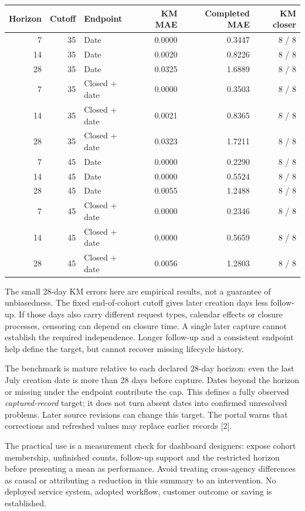\documentclass[10pt,letterpaper]{article}
\begin{document}
\begin{center}\small\begin{tabular}{rrlrrr}\toprule
Horizon & Cutoff & Endpoint & KM MAE & Completed MAE & KM closer\\\midrule
7 & 35 & Date & 0.0000 & 0.3447 & 8 / 8\\
14 & 35 & Date & 0.0020 & 0.8226 & 8 / 8\\
28 & 35 & Date & 0.0325 & 1.6889 & 8 / 8\\
7 & 35 & Closed + date & 0.0000 & 0.3503 & 8 / 8\\
14 & 35 & Closed + date & 0.0021 & 0.8365 & 8 / 8\\
28 & 35 & Closed + date & 0.0323 & 1.7211 & 8 / 8\\
7 & 45 & Date & 0.0000 & 0.2290 & 8 / 8\\
14 & 45 & Date & 0.0000 & 0.5524 & 8 / 8\\
28 & 45 & Date & 0.0055 & 1.2488 & 8 / 8\\
7 & 45 & Closed + date & 0.0000 & 0.2346 & 8 / 8\\
14 & 45 & Closed + date & 0.0000 & 0.5659 & 8 / 8\\
28 & 45 & Closed + date & 0.0056 & 1.2803 & 8 / 8\\
\bottomrule\end{tabular}\end{center}

The small 28-day KM errors here are empirical results, not a guarantee of unbiasedness. The fixed end-of-cohort cutoff gives later creation days less follow-up. If those days also carry different request types, calendar effects or closure processes, censoring can depend on closure time. A single later capture cannot establish the required independence. Longer follow-up and a consistent endpoint help define the target, but cannot recover missing lifecycle history.

The benchmark is mature relative to each declared 28-day horizon: even the last July creation date is more than 28 days before capture. Dates beyond the horizon or missing under the endpoint contribute the cap. This defines a fully observed \emph{captured-record} target; it does not turn absent dates into confirmed unresolved problems. Later source revisions can change this target. The portal warns that corrections and refreshed values may replace earlier records [2].

The practical use is a measurement check for dashboard designers: expose cohort membership, unfinished counts, follow-up support and the restricted horizon before presenting a mean as performance. Avoid treating cross-agency differences as causal or attributing a reduction in this summary to an intervention. No deployed service system, adopted workflow, customer outcome or saving is established.
\end{document}
